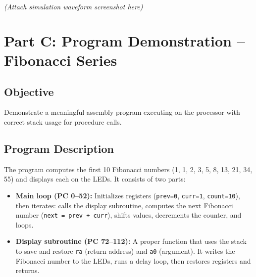 \documentclass[12pt,a4paper]{article}
\begin{document}
\textit{(Attach simulation waveform screenshot here)}

\section{Part C: Program Demonstration -- Fibonacci Series}

\subsection{Objective}
Demonstrate a meaningful assembly program executing on the processor with correct stack usage for procedure calls.

\subsection{Program Description}
The program computes the first 10 Fibonacci numbers (1, 1, 2, 3, 5, 8, 13, 21, 34, 55) and displays each on the LEDs. It consists of two parts:

\begin{itemize}
    \item \textbf{Main loop (PC 0--52):} Initializes registers (\texttt{prev=0}, \texttt{curr=1}, \texttt{count=10}), then iterates: calls the display subroutine, computes the next Fibonacci number (\texttt{next = prev + curr}), shifts values, decrements the counter, and loops.
    \item \textbf{Display subroutine (PC 72--112):} A proper function that uses the stack to save and restore \texttt{ra} (return address) and \texttt{a0} (argument). It writes the Fibonacci number to the LEDs, runs a delay loop, then restores registers and returns.
\end{itemize}
\end{document}
